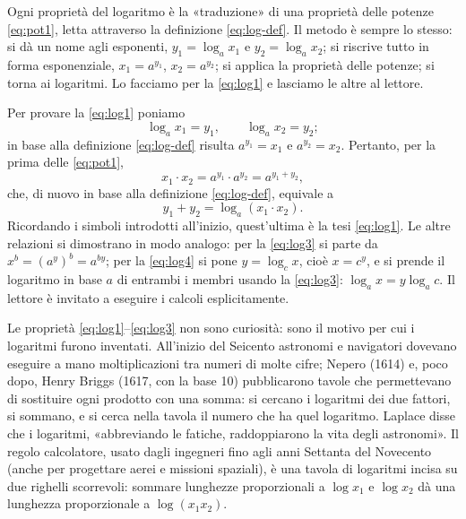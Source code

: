 \begin{schema}
\end{schema}

\begin{strategia}
Ogni proprietà del logaritmo è la «traduzione» di una proprietà delle potenze
\eqref{eq:pot1}, letta attraverso la definizione \eqref{eq:log-def}. Il metodo è sempre
lo stesso: si dà un nome agli esponenti, $y_{1}=\log_{a}x_{1}$ e $y_{2}=\log_{a}x_{2}$;
si riscrive tutto in forma esponenziale, $x_{1}=a^{y_{1}}$, $x_{2}=a^{y_{2}}$; si
applica la proprietà delle potenze; si torna ai logaritmi. Lo facciamo per la
\eqref{eq:log1} e lasciamo le altre al lettore.
\end{strategia}

\begin{dimostrazione}
Per provare la \eqref{eq:log1} poniamo
\[
  \log_{a}x_{1}=y_{1}, \qquad \log_{a}x_{2}=y_{2};
\]
in base alla definizione \eqref{eq:log-def} risulta $a^{y_{1}}=x_{1}$ e
$a^{y_{2}}=x_{2}$. Pertanto, per la prima delle \eqref{eq:pot1},
\[
  x_{1}\cdot x_{2}=a^{y_{1}}\cdot a^{y_{2}}=a^{y_{1}+y_{2}},
\]
che, di nuovo in base alla definizione \eqref{eq:log-def}, equivale a
\[
  y_{1}+y_{2}=\log_{a}(x_{1}\cdot x_{2}).
\]
Ricordando i simboli introdotti all'inizio, quest'ultima è la tesi \eqref{eq:log1}. Le
altre relazioni si dimostrano in modo analogo: per la \eqref{eq:log3} si parte da
$x^{b}=(a^{y})^{b}=a^{by}$; per la \eqref{eq:log4} si pone $y=\log_{c}x$, cioè
$x=c^{y}$, e si prende il logaritmo in base $a$ di entrambi i membri usando la
\eqref{eq:log3}: $\log_{a}x=y\log_{a}c$. Il lettore è invitato a eseguire i calcoli
esplicitamente.
\end{dimostrazione}

\begin{notastorica}
Le proprietà \eqref{eq:log1}--\eqref{eq:log3} non sono curiosità: sono il motivo per cui
i logaritmi furono inventati. All'inizio del Seicento astronomi e navigatori dovevano
eseguire a mano moltiplicazioni tra numeri di molte cifre; Nepero (1614) e, poco dopo,
Henry Briggs (1617, con la base 10) pubblicarono tavole che permettevano di sostituire
ogni prodotto con una somma: si cercano i logaritmi dei due fattori, si sommano, e si
cerca nella tavola il numero che ha quel logaritmo. Laplace disse che i logaritmi,
«abbreviando le fatiche, raddoppiarono la vita degli astronomi». Il regolo calcolatore,
usato dagli ingegneri fino agli anni Settanta del Novecento (anche per progettare
aerei e missioni spaziali), è una tavola di logaritmi incisa su due righelli
scorrevoli: sommare lunghezze proporzionali a $\log x_{1}$ e $\log x_{2}$ dà una
lunghezza proporzionale a $\log(x_{1}x_{2})$.
\end{notastorica}


